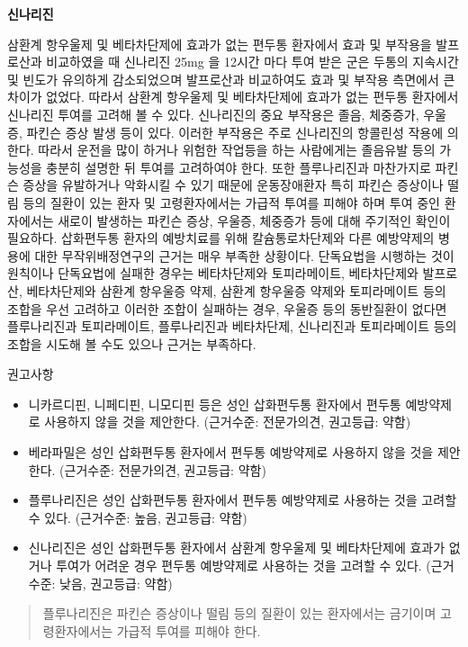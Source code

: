 \documentclass[]{book}
\begin{document}
\textbf{신나리진}

삼환계 항우울제 및 베타차단제에 효과가 없는 편두통 환자에서 효과 및 부작용을 발프로산과 비교하였을 때 신나리진 25mg 을 12시간 마다 투여 받은 군은 두통의 지속시간 및 빈도가 유의하게 감소되었으며 발프로산과 비교하여도 효과 및 부작용 측면에서 큰 차이가 없었다. 따라서 삼환계 항우울제 및 베타차단제에 효과가 없는 편두통 환자에서 신나리진 투여를 고려해 볼 수 있다. 신나리진의 중요 부작용은 졸음, 체중증가, 우울증, 파킨슨 증상 발생 등이 있다. 이러한 부작용은 주로 신나리진의 항콜린성 작용에 의한다. 따라서 운전을 많이 하거나 위험한 작업등을 하는 사람에게는 졸음유발 등의 가능성을 충분히 설명한 뒤 투여를 고려하여야 한다. 또한 플루나리진과 마찬가지로 파킨슨 증상을 유발하거나 악화시킬 수 있기 때문에 운동장애환자 특히 파킨슨 증상이나 떨림 등의 질환이 있는 환자 및 고령환자에서는 가급적 투여를 피해야 하며 투여 중인 환자에서는 새로이 발생하는 파킨슨 증상, 우울증, 체중증가 등에 대해 주기적인 확인이 필요하다.
삽화편두통 환자의 예방치료를 위해 칼슘통로차단제와 다른 예방약제의 병용에 대한 무작위배정연구의 근거는 매우 부족한 상황이다. 단독요법을 시행하는 것이 원칙이나 단독요법에 실패한 경우는 베타차단제와 토피라메이트, 베타차단제와 발프로산, 베타차단제와 삼환계 항우울증 약제, 삼환계 항우울증 약제와 토피라메이트 등의 조합을 우선 고려하고 이러한 조합이 실패하는 경우, 우울증 등의 동반질환이 없다면 플루나리진과 토피라메이트, 플루나리진과 베타차단제, 신나리진과 토피라메이트 등의 조합을 시도해 볼 수도 있으나 근거는 부족하다.

권고사항

\begin{itemize}
\item
  니카르디핀, 니페디핀, 니모디핀 등은 성인 삽화편두통 환자에서 편두통 예방약제로 사용하지 않을 것을 제안한다. (근거수준: 전문가의견, 권고등급: 약함)
\item
  베라파밀은 성인 삽화편두통 환자에서 편두통 예방약제로 사용하지 않을 것을 제안한다. (근거수준: 전문가의견, 권고등급: 약함)
\item
  플루나리진은 성인 삽화편두통 환자에서 편두통 예방약제로 사용하는 것을 고려할 수 있다. (근거수준: 높음, 권고등급: 약함)
\item
  신나리진은 성인 삽화편두통 환자에서 삼환계 항우울제 및 베타차단제에 효과가 없거나 투여가 어려운 경우 편두통 예방약제로 사용하는 것을 고려할 수 있다. (근거수준: 낮음, 권고등급: 약함)
\end{itemize}

\begin{quote}
플루나리진은 파킨슨 증상이나 떨림 등의 질환이 있는 환자에서는 금기이며 고령환자에서는 가급적 투여를 피해야 한다.
\end{quote}
\end{document}
